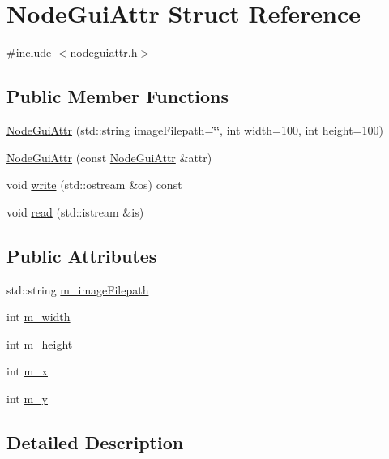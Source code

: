 \hypertarget{struct_node_gui_attr}{}\section{Node\+Gui\+Attr Struct Reference}
\label{struct_node_gui_attr}


{\ttfamily \#include $<$nodeguiattr.\+h$>$}

\subsection*{Public Member Functions}
\begin{DoxyCompactItemize}
\item 
\mbox{\hyperlink{struct_node_gui_attr_a97f0593ab84f42b7bd691d6715ccf20f}{Node\+Gui\+Attr}} (std\+::string image\+Filepath=\char`\"{}\char`\"{}, int width=100, int height=100)
\item 
\mbox{\hyperlink{struct_node_gui_attr_abc15288865839636ce85c9e2a5c6dd68}{Node\+Gui\+Attr}} (const \mbox{\hyperlink{struct_node_gui_attr}{Node\+Gui\+Attr}} \&attr)
\item 
void \mbox{\hyperlink{struct_node_gui_attr_aabc33d777e16fd3640cf224edd4e0f9f}{write}} (std\+::ostream \&os) const
\item 
void \mbox{\hyperlink{struct_node_gui_attr_a7ce8e0863f88a40e242bc3ba71c37663}{read}} (std\+::istream \&is)
\end{DoxyCompactItemize}
\subsection*{Public Attributes}
\begin{DoxyCompactItemize}
\item 
std\+::string \mbox{\hyperlink{struct_node_gui_attr_ae8361faefecd978e2a749e0e838af86b}{m\+\_\+image\+Filepath}}
\item 
int \mbox{\hyperlink{struct_node_gui_attr_ad9b18df17570cefcd755bcee9d7d3cdb}{m\+\_\+width}}
\item 
int \mbox{\hyperlink{struct_node_gui_attr_aad75cafcb74b64f13842efc6b3c755d1}{m\+\_\+height}}
\item 
int \mbox{\hyperlink{struct_node_gui_attr_a1e4e5581cf2ed1f47398a14a65d4598f}{m\+\_\+x}}
\item 
int \mbox{\hyperlink{struct_node_gui_attr_aa0e7b15590cc2a32cb82799770298975}{m\+\_\+y}}
\end{DoxyCompactItemize}


\subsection{Detailed Description}



